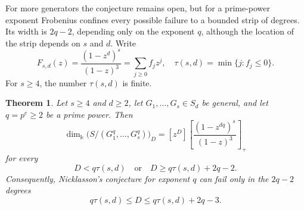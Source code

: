 \documentclass[11pt]{amsart}
\newtheorem{theorem}{Theorem}[section]
\theoremstyle{remark}
\newcommand{\kk}{\Bbbk}
\begin{document}
For more generators the conjecture remains open, but for a prime-power exponent Frobenius confines every possible failure to a bounded strip of degrees. Its width is $2q-2$, depending only on the exponent $q$, although the location of the strip depends on $s$ and $d$. Write
\begin{equation}\label{eq:source-Froberg}
F_{s,d}(z)=\frac{(1-z^d)^s}{(1-z)^3}=\sum_{j\ge0}f_jz^j,
\quad
\tau(s,d)=\min\{j:f_j\le0\}.
\end{equation}
For $s\ge4$, the number $\tau(s,d)$ is finite.

\begin{theorem}\label{thm:Nicklasson-three-vars}
Let $s\ge4$ and $d\ge2$, let $G_1,\ldots,G_s\in S_d$ be general, and let $q=p^e\ge2$ be a prime power. Then
\begin{equation}\label{eq:Nicklasson-outside-strip}
\dim_{\kk}\bigl(S/(G_1^q,\ldots,G_s^q)\bigr)_D
=
[z^D]\left[\frac{(1-z^{dq})^s}{(1-z)^3}\right]_+
\end{equation}
for every
$$
D<q\tau(s,d)
\quad\text{or}\quad
D\ge q\tau(s,d)+2q-2.
$$
Consequently, Nicklasson's conjecture for exponent $q$ can fail only in the $2q-2$ degrees
\begin{equation}\label{eq:Nicklasson-strip}
q\tau(s,d)\le D\le q\tau(s,d)+2q-3.
\end{equation}
\end{theorem}
\end{document}
